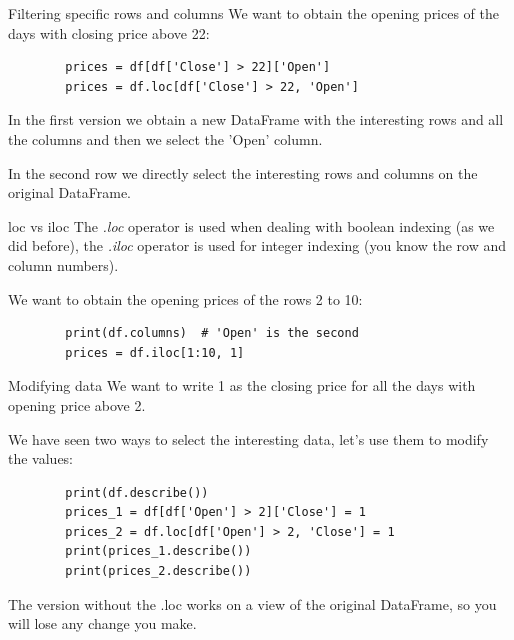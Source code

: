 \documentclass[aspectratio=169,]{beamer}
\begin{document}
\begin{frame}[fragile]{Filtering specific rows and columns}
    We want to obtain the opening prices of the days with closing price above 22:
    \begin{verbatim}
        prices = df[df['Close'] > 22]['Open']
        prices = df.loc[df['Close'] > 22, 'Open']
    \end{verbatim}

    In the first version we obtain a new DataFrame with the interesting rows and all the columns and then we select the
    'Open' column.

    In the second row we directly select the interesting rows and columns on the original DataFrame.
\end{frame}

\begin{frame}[fragile]{loc vs iloc}
    The \emph{.loc} operator is used when dealing with boolean indexing (as we did before), the \emph{.iloc} operator is
    used for integer indexing (you know the row and column numbers).

    We want to obtain the opening prices of the rows 2 to 10:
    \begin{verbatim}
        print(df.columns)  # 'Open' is the second
        prices = df.iloc[1:10, 1]
    \end{verbatim}
\end{frame}

\begin{frame}[fragile]{Modifying data}
    We want to write 1 as the closing price for all the days with opening price above 2.

    We have seen two ways to select the interesting data, let's use them to modify the values:
    \begin{verbatim}
        print(df.describe())
        prices_1 = df[df['Open'] > 2]['Close'] = 1
        prices_2 = df.loc[df['Open'] > 2, 'Close'] = 1
        print(prices_1.describe())
        print(prices_2.describe())
    \end{verbatim}

    \pause
    The version without the .loc works on a view of the original DataFrame, so you will lose any change you make.
\end{frame}
\end{document}
